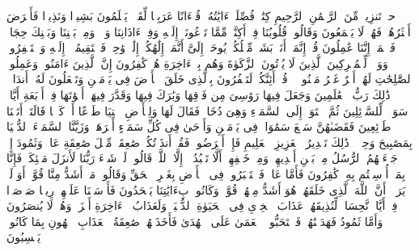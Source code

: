 \stopbuffer%
\startbuffer[\q:41:1]
حمۤ%
\stopbuffer%
\startbuffer[\q:41:2]
تَنزِیلࣱ مِّنَ ٱلرَّحۡمَٰنِ ٱلرَّحِیمِ%
\stopbuffer%
\startbuffer[\q:41:3]
كِتَٰبࣱ فُصِّلَتۡ ءَایَٰتُهُۥ قُرۡءَانًا عَرَبِیࣰّا لِّقَوۡمࣲ یَعۡلَمُونَ%
\stopbuffer%
\startbuffer[\q:41:4]
بَشِیرࣰا وَنَذِیرࣰا فَأَعۡرَضَ أَكۡثَرُهُمۡ فَهُمۡ لَا یَسۡمَعُونَ%
\stopbuffer%
\startbuffer[\q:41:5]
وَقَالُوا۟ قُلُوبُنَا فِیۤ أَكِنَّةࣲ مِّمَّا تَدۡعُونَاۤ إِلَیۡهِ وَفِیۤ ءَاذَانِنَا وَقۡرࣱ وَمِنۢ بَیۡنِنَا وَبَیۡنِكَ حِجَابࣱ فَٱعۡمَلۡ إِنَّنَا عَٰمِلُونَ%
\stopbuffer%
\startbuffer[\q:41:6]
قُلۡ إِنَّمَاۤ أَنَا۠ بَشَرࣱ مِّثۡلُكُمۡ یُوحَىٰۤ إِلَیَّ أَنَّمَاۤ إِلَٰهُكُمۡ إِلَٰهࣱ وَٰحِدࣱ فَٱسۡتَقِیمُوۤا۟ إِلَیۡهِ وَٱسۡتَغۡفِرُوهُۗ وَوَیۡلࣱ لِّلۡمُشۡرِكِینَ%
\stopbuffer%
\startbuffer[\q:41:7]
ٱلَّذِینَ لَا یُؤۡتُونَ ٱلزَّكَوٰةَ وَهُم بِٱلۡءَاخِرَةِ هُمۡ كَٰفِرُونَ%
\stopbuffer%
\startbuffer[\q:41:8]
إِنَّ ٱلَّذِینَ ءَامَنُوا۟ وَعَمِلُوا۟ ٱلصَّٰلِحَٰتِ لَهُمۡ أَجۡرٌ غَیۡرُ مَمۡنُونࣲ%
\stopbuffer%
\startbuffer[\q:41:9]
۞ قُلۡ أَئِنَّكُمۡ لَتَكۡفُرُونَ بِٱلَّذِی خَلَقَ ٱلۡأَرۡضَ فِی یَوۡمَیۡنِ وَتَجۡعَلُونَ لَهُۥۤ أَندَادࣰاۚ ذَٰلِكَ رَبُّ ٱلۡعَٰلَمِینَ%
\stopbuffer%
\startbuffer[\q:41:10]
وَجَعَلَ فِیهَا رَوَٰسِیَ مِن فَوۡقِهَا وَبَٰرَكَ فِیهَا وَقَدَّرَ فِیهَاۤ أَقۡوَٰتَهَا فِیۤ أَرۡبَعَةِ أَیَّامࣲ سَوَاۤءࣰ لِّلسَّاۤئِلِینَ%
\stopbuffer%
\startbuffer[\q:41:11]
ثُمَّ ٱسۡتَوَىٰۤ إِلَى ٱلسَّمَاۤءِ وَهِیَ دُخَانࣱ فَقَالَ لَهَا وَلِلۡأَرۡضِ ٱئۡتِیَا طَوۡعًا أَوۡ كَرۡهࣰا قَالَتَاۤ أَتَیۡنَا طَاۤئِعِینَ%
\stopbuffer%
\startbuffer[\q:41:12]
فَقَضَىٰهُنَّ سَبۡعَ سَمَٰوَاتࣲ فِی یَوۡمَیۡنِ وَأَوۡحَىٰ فِی كُلِّ سَمَاۤءٍ أَمۡرَهَاۚ وَزَیَّنَّا ٱلسَّمَاۤءَ ٱلدُّنۡیَا بِمَصَٰبِیحَ وَحِفۡظࣰاۚ ذَٰلِكَ تَقۡدِیرُ ٱلۡعَزِیزِ ٱلۡعَلِیمِ%
\stopbuffer%
\startbuffer[\q:41:13]
فَإِنۡ أَعۡرَضُوا۟ فَقُلۡ أَنذَرۡتُكُمۡ صَٰعِقَةࣰ مِّثۡلَ صَٰعِقَةِ عَادࣲ وَثَمُودَ%
\stopbuffer%
\startbuffer[\q:41:14]
إِذۡ جَاۤءَتۡهُمُ ٱلرُّسُلُ مِنۢ بَیۡنِ أَیۡدِیهِمۡ وَمِنۡ خَلۡفِهِمۡ أَلَّا تَعۡبُدُوۤا۟ إِلَّا ٱللَّهَۖ قَالُوا۟ لَوۡ شَاۤءَ رَبُّنَا لَأَنزَلَ مَلَٰۤئِكَةࣰ فَإِنَّا بِمَاۤ أُرۡسِلۡتُم بِهِۦ كَٰفِرُونَ%
\stopbuffer%
\startbuffer[\q:41:15]
فَأَمَّا عَادࣱ فَٱسۡتَكۡبَرُوا۟ فِی ٱلۡأَرۡضِ بِغَیۡرِ ٱلۡحَقِّ وَقَالُوا۟ مَنۡ أَشَدُّ مِنَّا قُوَّةًۖ أَوَ لَمۡ یَرَوۡا۟ أَنَّ ٱللَّهَ ٱلَّذِی خَلَقَهُمۡ هُوَ أَشَدُّ مِنۡهُمۡ قُوَّةࣰۖ وَكَانُوا۟ بِءَایَٰتِنَا یَجۡحَدُونَ%
\stopbuffer%
\startbuffer[\q:41:16]
فَأَرۡسَلۡنَا عَلَیۡهِمۡ رِیحࣰا صَرۡصَرࣰا فِیۤ أَیَّامࣲ نَّحِسَاتࣲ لِّنُذِیقَهُمۡ عَذَابَ ٱلۡخِزۡیِ فِی ٱلۡحَیَوٰةِ ٱلدُّنۡیَاۖ وَلَعَذَابُ ٱلۡءَاخِرَةِ أَخۡزَىٰۖ وَهُمۡ لَا یُنصَرُونَ%
\stopbuffer%
\startbuffer[\q:41:17]
وَأَمَّا ثَمُودُ فَهَدَیۡنَٰهُمۡ فَٱسۡتَحَبُّوا۟ ٱلۡعَمَىٰ عَلَى ٱلۡهُدَىٰ فَأَخَذَتۡهُمۡ صَٰعِقَةُ ٱلۡعَذَابِ ٱلۡهُونِ بِمَا كَانُوا۟ یَكۡسِبُونَ%
